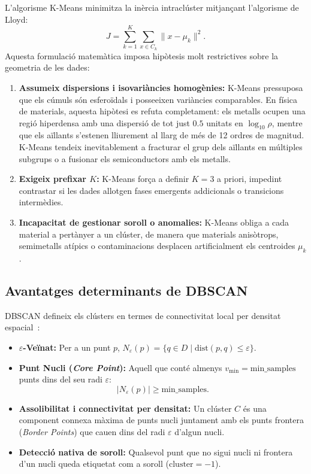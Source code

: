 \documentclass[a4paper,11pt]{article}
\begin{document}
L'algorisme K-Means minimitza la inèrcia intraclúster mitjançant l'algorisme de Lloyd:
\begin{equation}
    J = \sum_{k=1}^K \sum_{x \in C_k} \lVert x - \mu_k \rVert^2.
\end{equation}
Aquesta formulació matemàtica imposa hipòtesis molt restrictives sobre la geometria de les dades:
\begin{enumerate}
    \item \textbf{Assumeix dispersions i isovariàncies homogènies:} K-Means pressuposa que els cúmuls són esferoïdals i posseeixen variàncies comparables. En física de materials, aquesta hipòtesi es refuta completament: els metalls ocupen una regió hiperdensa amb una dispersió de tot just $0.5$ unitats en $\log_{10}\rho$, mentre que els aïllants s'estenen lliurement al llarg de més de 12 ordres de magnitud. K-Means tendeix inevitablement a fracturar el grup dels aïllants en múltiples subgrups o a fusionar els semiconductors amb els metalls.
    \item \textbf{Exigeix prefixar $K$:} K-Means força a definir $K=3$ a priori, impedint contrastar si les dades allotgen fases emergents addicionals o transicions intermèdies.
    \item \textbf{Incapacitat de gestionar soroll o anomalies:} K-Means obliga a cada material a pertànyer a un clúster, de manera que materials anisòtrops, semimetalls atípics o contaminacions desplacen artificialment els centroides $\mu_k$.
\end{enumerate}

\subsection{Avantatges determinants de DBSCAN}

DBSCAN defineix els clústers en termes de connectivitat local per densitat espacial~\cite{ester1996, gfg_dbscan}:
\begin{itemize}
    \item \textbf{$\varepsilon$-Veïnat:} Per a un punt $p$, $N_\varepsilon(p) = \{q \in D \mid \mathrm{dist}(p, q) \le \varepsilon\}$.
    \item \textbf{Punt Nucli (\emph{Core Point}):} Aquell que conté almenys $v_{\min} = \text{min\_samples}$ punts dins del seu radi $\varepsilon$:
    \begin{equation}
        |N_\varepsilon(p)| \ge \text{min\_samples}.
    \end{equation}
    \item \textbf{Assolibilitat i connectivitat per densitat:} Un clúster $C$ és una component connexa màxima de punts nucli juntament amb els punts frontera (\emph{Border Points}) que cauen dins del radi $\varepsilon$ d'algun nucli.
    \item \textbf{Detecció nativa de soroll:} Qualsevol punt que no sigui nucli ni frontera d'un nucli queda etiquetat com a soroll ($\text{cluster} = -1$).
\end{itemize}
\end{document}
